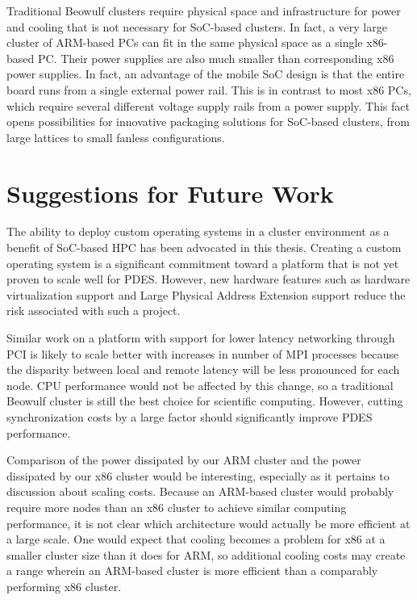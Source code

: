 \documentclass[11pt]{book}
\begin{document}
Traditional Beowulf clusters require physical space and infrastructure for power and
cooling that is not necessary for SoC-based clusters.  In fact, a very large cluster of
ARM-based PCs can fit in the same physical space as a single x86-based PC.  Their power
supplies are also much smaller than corresponding x86 power supplies.  In fact, an
advantage of the mobile SoC design is that the entire board runs from a single external
power rail.  This is in contrast to most x86 PCs, which require several different voltage
supply rails from a power supply.  This fact opens possibilities for innovative packaging
solutions for SoC-based clusters, from large lattices to small fanless configurations.

\section{Suggestions for Future Work}

The ability to deploy custom operating systems in a cluster environment as a benefit of
SoC-based HPC has been advocated in this thesis.  Creating a custom operating system is a
significant commitment toward a platform that is not yet proven to scale well for PDES.
However, new hardware features such as hardware virtualization support and Large Physical
Address Extension support reduce the risk associated with such a project.

Similar work on a platform with support for lower latency networking through PCI is likely
to scale better with increases in number of MPI processes because the disparity between
local and remote latency will be less pronounced for each node.  CPU performance would not
be affected by this change, so a traditional Beowulf cluster is still the best choice for
scientific computing.  However, cutting synchronization costs by a large factor should
significantly improve PDES performance.

Comparison of the power dissipated by our ARM cluster and the power dissipated by our x86
cluster would be interesting, especially as it pertains to discussion about scaling costs.
Because an ARM-based cluster would probably require more nodes than an x86 cluster to
achieve similar computing performance, it is not clear which architecture would actually
be more efficient at a large scale. One would expect that cooling becomes a problem for
x86 at a smaller cluster size than it does for ARM, so additional cooling costs may create
a range wherein an ARM-based cluster is more efficient than a comparably performing x86
cluster.
\end{document}
